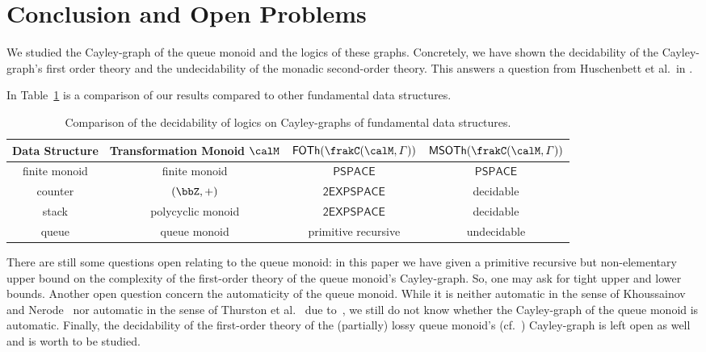 \documentclass[a4paper,numberwithinsect,USenglish]{lipics-v2018}
\theoremstyle{plain}
\theoremstyle{remark}
\newcommand{\classfont}[1]{\mathsf{#1}}
\newcommand{\cayley}[2]{\frakC(#1,#2)}
\newcommand{\FOTh}[1]{\classfont{FOTh}(#1)}
\newcommand{\MSOTh}[1]{\classfont{MSOTh}(#1)}
\begin{document}
\section{Conclusion and Open Problems}
We studied the Cayley-graph of the queue monoid and the logics of these graphs. Concretely, we have shown the decidability of the Cayley-graph's first order theory and the undecidability of the monadic second-order theory. This answers a question from Huschenbett et al.\ in \cite{HusKZ17}.

In Table~\ref{tab:conclusion} is a comparison of our results compared to other fundamental data structures.

\begin{table}[H]
	\begin{tabular}{cc|cc}
		Data Structure & Transformation Monoid $\calM$ & $\FOTh{\cayley{\calM}{\varGamma}}$ & $\MSOTh{\cayley{\calM}{\varGamma}}$\\
		\hline
		\hline
		finite monoid & finite monoid & $\classfont{PSPACE}$ \cite{Graedel03} & $\classfont{PSPACE}$ \cite{Graedel03}\\
		counter & $(\bbZ,+)$ & $\classfont{2EXPSPACE}$ \cite{KusL11} & decidable \cite{KusL06}\\
		stack & polycyclic monoid & $\classfont{2EXPSPACE}$ \cite{KusL11} & decidable \cite{DelKT03,KusL06}\\
		queue & queue monoid & primitive recursive & undecidable
	\end{tabular}
	\caption{Comparison of the decidability of logics on Cayley-graphs of fundamental data structures.\label{tab:conclusion}}
\end{table}%
There are still some questions open relating to the queue monoid: in this paper we have given a primitive recursive but non-elementary upper bound on the complexity of the first-order theory of the queue monoid's Cayley-graph. So, one may ask for tight upper and lower bounds.
Another open question concern the automaticity of the queue monoid. While it is neither automatic in the sense of Khoussainov and Nerode~\cite{KN95} nor automatic in the sense of Thurston et al.~\cite{CEHLPT92} due to~\cite{HusKZ17}, we still do not know whether the Cayley-graph of the queue monoid is automatic.
Finally, the decidability of the first-order theory of the (partially) lossy queue monoid's (cf.~\cite{KKP18,Koe18}) Cayley-graph is left open as well and is worth to be studied.

	
	
\end{document}
